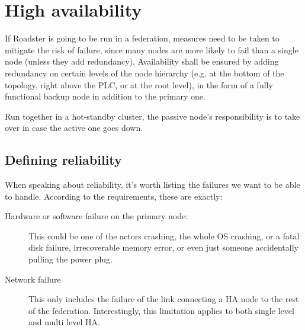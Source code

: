 \section{High availability}\label{sec:approach:ha}
If Roadster is going to be run in a federation, measures need to be taken to
mitigate the risk of failure, since many nodes are more likely to fail than a
single node (unless they add redundancy). Availability shall be ensured by
adding redundancy on certain levels of the node hierarchy (e.g. at the bottom
of the topology, right above the PLC, or at the root level), in the form of a
fully functional backup node in addition to the primary one.

Run together in a hot-standby cluster, the passive node's responsibility is to
take over in case the active one goes down.

\subsection{Defining reliability}
When speaking about reliability, it's worth listing the failures we want to be %
able to handle. According to the requirements, these are exactly:

\begin{description}
	\item [Hardware or software failure on the primary node:]
		This could be one of the actors crashing, the whole OS
		crashing, or a fatal disk failure, irrecoverable memory error,
		or even just someone accidentally pulling the power plug.

	\item [Network failure]
		This only includes the failure of the link connecting a HA node
		to the rest of the federation.  Interestingly, this limitation applies to both
		single level and multi level HA.
\end{description}

